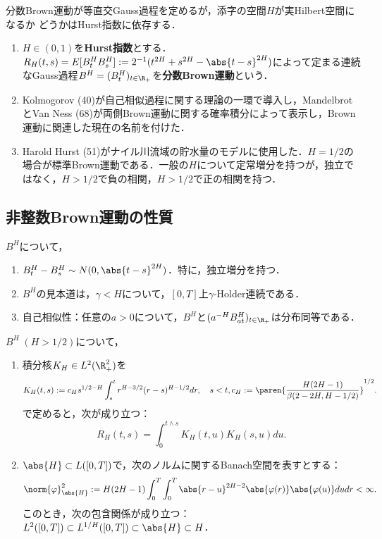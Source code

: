 \documentclass[uplatex,dvipdfmx]{jsreport}
\begin{document}
\begin{example}[分数Brown運動]
    分数Brown運動が等直交Gauss過程を定めるが，添字の空間$H$が実Hilbert空間になるか
    どうかはHurst指数に依存する．
    \begin{enumerate}
        \item $H\in(0,1)$を\textbf{Hurst指数}とする．$R_H(t,s)=E[B^H_tB^H_s]:=2^{-1}(t^{2H}+s^{2H}-\abs{t-s}^{2H})$によって定まる連続なGauss過程$B^H=(B^H_t)_{t\in\R_+}$を\textbf{分数Brown運動}という．
        \item Kolmogorov (40)が自己相似過程に関する理論の一環で導入し，MandelbrotとVan Ness (68)が両側Brown運動に関する確率積分によって表示し，Brown運動に関連した現在の名前を付けた．
        \item Harold Hurst (51)がナイル川流域の貯水量のモデルに使用した．$H=1/2$の場合が標準Brown運動である．一般の$H$について定常増分を持つが，独立ではなく，$H>1/2$で負の相関，$H>1/2$で正の相関を持つ．
    \end{enumerate}
\end{example}

\begin{example}
    
\end{example}

\subsection{非整数Brown運動の性質}

\begin{proposition}
    $B^H$について，
    \begin{enumerate}
        \item $B^H_t-B^H_s\sim N(0,\abs{t-s}^{2H})$．特に，独立増分を持つ．
        \item $B^H$の見本道は，$\gamma<H$について，$[0,T]$上$\gamma$-Holder連続である．
        \item 自己相似性：任意の$a>0$について，$B^H$と$(a^{-H}B^H_{at})_{t\in\R_+}$は分布同等である．
    \end{enumerate}
\end{proposition}

\begin{proposition}
    $B^H\;(H>1/2)$について，
    \begin{enumerate}
        \item 積分核$K_H\in L^2(\R_+^2)$を
        \[K_H(t,s):=c_Hs^{1/2-H}\int^t_sr^{H-3/2}(r-s)^{H-1/2}dr,\quad s<t,c_H:=\paren{\frac{H(2H-1)}{\beta(2-2H,H-1/2)}}^{1/2}.\]
        で定めると，次が成り立つ：
        \[R_H(t,s)=\int^{t\land s}_0K_H(t,u)K_H(s,u)du.\]
        \item $\abs{H}\subset L([0,T])$で，次のノルムに関するBanach空間を表すとする：
        \[\norm{\varphi}^2_{\abs{H}}:=H(2H-1)\int^T_0\int^T_0\abs{r-u}^{2H-2}\abs{\varphi(r)}\abs{\varphi(u)}dudr<\infty.\]
        このとき，次の包含関係が成り立つ：$L^2([0,T])\subset L^{1/H}([0,T])\subset\abs{H}\subset H$．
    \end{enumerate}
\end{proposition}
\end{document}
